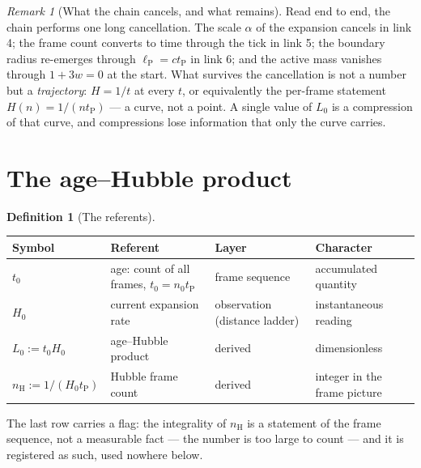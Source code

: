\documentclass[11pt]{amsbook}
\theoremstyle{plain}
\theoremstyle{definition}
\newtheorem{definition}[theorem]{Definition}
\theoremstyle{remark}
\newtheorem{remark}[theorem]{Remark}
\begin{document}
\begin{remark}[What the chain cancels, and what remains]\label{rem:what-remains}
Read end to end, the chain performs one long cancellation. The scale $\alpha$ of the expansion cancels in link 4; the frame count converts to time through the tick in link 5; the boundary radius re-emerges through $\ell_{\mathrm P} = ct_{\mathrm P}$ in link 6; and the active mass vanishes through $1 + 3w = 0$ at the start. What survives the cancellation is not a number but a \emph{trajectory}: $H = 1/t$ at every $t$, or equivalently the per-frame statement $H(n) = 1/(nt_{\mathrm P})$ --- a curve, not a point. A single value of $L_{0}$ is a compression of that curve, and compressions lose information that only the curve carries.
\end{remark}

\section{The age--Hubble product}\label{sec:age-hubble}

\begin{definition}[The referents]\label{def:referents}
\begin{center}
\begin{tabular}{@{}p{2.6cm}p{3.8cm}p{2.8cm}p{2.0cm}@{}}
\toprule
Symbol & Referent & Layer & Character \\
\midrule
$t_{0}$ & age: count of all frames, $t_{0} = n_{0}t_{\mathrm P}$ & frame sequence & accumulated quantity \\
$H_{0}$ & current expansion rate & observation (distance ladder) & instantaneous reading \\
$L_{0} := t_{0}H_{0}$ & age--Hubble product & derived & dimensionless \\
$n_{\mathrm H} := 1/(H_{0}t_{\mathrm P})$ & Hubble frame count & derived & integer in the frame picture \\
\bottomrule
\end{tabular}
\end{center}
The last row carries a flag: the integrality of $n_{\mathrm H}$ is a statement of the frame sequence, not a measurable fact --- the number is too large to count --- and it is registered as such, used nowhere below.
\end{definition}
\end{document}

